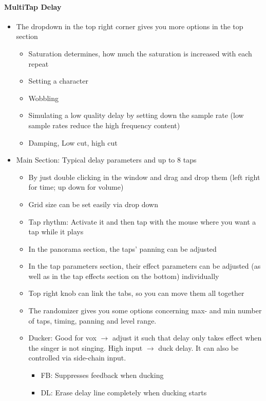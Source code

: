 \documentclass[10pt]{article}
\begin{document}
\paragraph{MultiTap Delay}

\begin{itemize}
	\item The dropdown in the top right corner gives you more options in the top section
	\begin{itemize}
		\item Saturation determines, how much the saturation is increased with each repeat
		\item Setting a character
		\item Wobbling
		\item Simulating a low quality delay by setting down the sample rate (low sample rates reduce the high frequency content)
		\item Damping, Low cut, high cut
	\end{itemize}
	\item Main Section: Typical delay parameters and up to 8 taps
	\begin{itemize}
		\item By just double clicking in the window and drag and drop them (left right for time; up down for volume)
		\item Grid size can be set easily via drop down
		\item Tap rhythm: Activate it and then tap with the mouse where you want a tap while it plays
		\item In the panorama section, the taps' panning can be adjusted
		\item In the tap parameters section, their effect parameters can be adjusted (as well as in the tap effects section on the bottom) individually
		\item Top right knob can link the tabs, so you can move them all together
		\item The randomizer gives you some options concerning max- and min number of taps, timing, panning and level range.
		\item Ducker: Good for vox $\rightarrow$ adjust it such that delay only takes effect when the singer is not singing. High input $\rightarrow$ duck delay. It can also be controlled via side-chain input.
		\begin{itemize}
			\item FB: Suppresses feedback when ducking
			\item DL: Erase delay line completely when ducking starts

\end{itemize}
\end{itemize}
\end{itemize}
\end{document}
